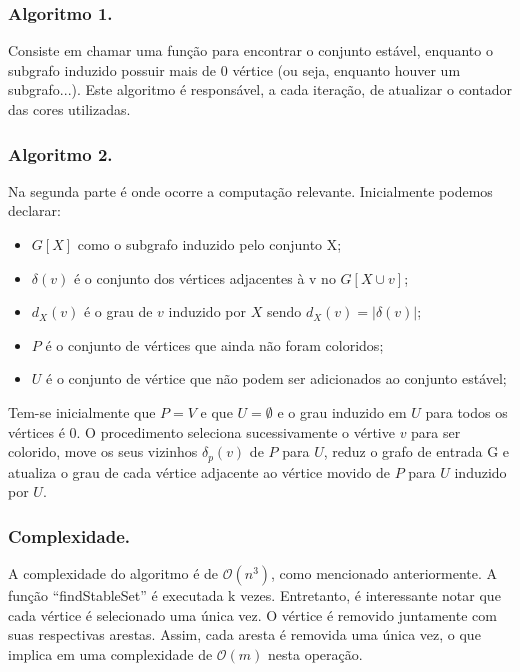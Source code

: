 \documentclass[a4paper,12pt]{article}
\begin{document}
\subsubsection{Algoritmo 1.}

Consiste em chamar uma função para encontrar o conjunto estável, enquanto o subgrafo induzido possuir mais de 0 vértice (ou seja, enquanto houver um subgrafo...). Este algoritmo é responsável, a cada iteração, de atualizar o contador das cores utilizadas.

\subsubsection{Algoritmo 2.}

Na segunda parte é onde ocorre a computação relevante. Inicialmente podemos declarar:

\begin{itemize}
\item $G[X]$ como o subgrafo induzido pelo conjunto X;
\item $\delta (v)$ é o conjunto dos vértices adjacentes à v no $G[X \cup v]$;
\item $d_X(v)$ é o grau de $v$ induzido por $X$ sendo $d_X(v) = |\delta (v)|$;
\item $P$ é o conjunto de vértices que ainda não foram coloridos;
\item $U$ é o conjunto de vértice que não podem ser adicionados ao conjunto estável;
\end{itemize}

Tem-se inicialmente que $P = V$ e que $U = \emptyset$ e o grau induzido em $U$ para todos os vértices é 0. O procedimento seleciona sucessivamente o vértive $v$ para ser colorido, move os seus vizinhos $\delta_p (v)$ de $P$ para $U$, reduz o grafo de entrada G e atualiza o grau de cada vértice adjacente ao vértice movido de $P$ para $U$ induzido por $U$.

\subsubsection{Complexidade.}

A complexidade do algoritmo é de $\mathcal{O}(n^3)$, como mencionado anteriormente. A função ``findStableSet'' é executada k vezes. Entretanto, é interessante notar que cada vértice é selecionado uma única vez. O vértice é removido juntamente com suas respectivas arestas. Assim, cada aresta é removida uma única vez, o que implica em uma complexidade de $\mathcal{O}(m)$ nesta operação.
\end{document}
